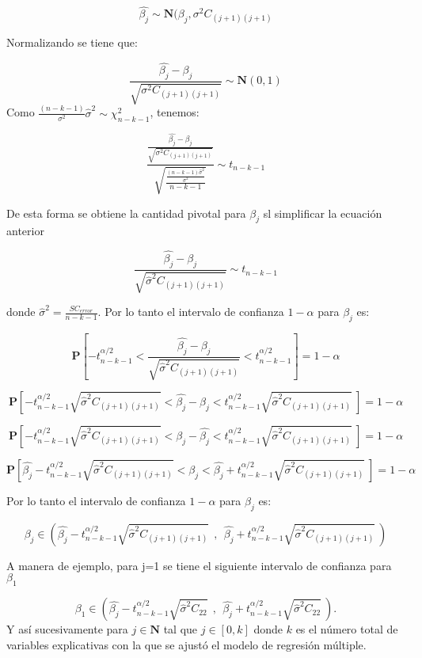 \documentclass[
  a4paper,
  oneside,
  openany]{book}
\begin{document}
\[\hat{\beta_{j}} \sim \mathbf{N}(\beta_{j}, \sigma^2C_{(j+1)(j+1)}\]

Normalizando se tiene que:

\[\frac{\hat{\beta_{j}}-\beta_{j}}{\sqrt{\sigma^2C_{(j+1)(j+1)}}}\sim \mathbf{N}(0,1)\]
Como \(\frac{(n-k-1)}{\sigma^2}\hat{\sigma}^2 \sim \chi^2_{n-k-1}\), tenemos:

\[\frac{\frac{\hat{\beta_{j}}-\beta_{j}}{\sqrt{\sigma^2C_{(j+1)(j+1)}}}}{\sqrt{\frac{\frac{(n-k-1)\hat{\sigma}^2}{\sigma^2}}{n-k-1}}} \sim t_{n-k-1}\]

De esta forma se obtiene la cantidad pivotal para \(\beta_{j}\) sl simplificar la ecuación anterior

\[\frac{\hat{\beta_{j}}-\beta_{j}}{\sqrt{\hat{\sigma}^2C_{(j+1)(j+1)}}}\sim t_{n-k-1}\]

donde \(\hat{\sigma}^2=\frac{SC_{error}}{n-k-1}\). Por lo tanto el intervalo de confianza \(1-\alpha\) para \(\beta_{j}\) es:

\[\mathbf{P} \left[-t^{\alpha/2}_{n-k-1} < \frac{\hat{\beta_{j}}-\beta_{j}}{\sqrt{\hat{\sigma}^2C_{(j+1)(j+1)}}} < t^{\alpha/2}_{n-k-1} \right]= 1- \alpha\]

\[\mathbf{P} \left[-t^{\alpha/2}_{n-k-1}{\sqrt{\hat{\sigma}^2C_{(j+1)(j+1)}}} < \hat{\beta_{j}}-\beta_{j} < t^{\alpha/2}_{n-k-1}{\sqrt{\hat{\sigma}^2C_{(j+1)(j+1)}}} \  \right]= 1- \alpha\]

\[\mathbf{P} \left[-t^{\alpha/2}_{n-k-1}{\sqrt{\hat{\sigma}^2C_{(j+1)(j+1)}}} < \beta_{j}-\hat{\beta_{j}} < t^{\alpha/2}_{n-k-1}{\sqrt{\hat{\sigma}^2C_{(j+1)(j+1)}}}  \ \right]= 1- \alpha\]

\[\mathbf{P} \left[\hat{\beta_{j}}-t^{\alpha/2}_{n-k-1}{\sqrt{\hat{\sigma}^2C_{(j+1)(j+1)}}} < \beta_{j} < \hat{\beta_{j}}+t^{\alpha/2}_{n-k-1}{\sqrt{\hat{\sigma}^2C_{(j+1)(j+1)}}}  \ \right]= 1- \alpha\]

Por lo tanto el intervalo de confianza \(1-\alpha\) para \(\beta_{j}\) es:

\[\beta_{j} \in \left(\hat{\beta_{j}}-t^{\alpha/2}_{n-k-1}{\sqrt{\hat{\sigma}^2C_{(j+1)(j+1)}}} \ \ , \ \ \hat{\beta_{j}}+t^{\alpha/2}_{n-k-1}{\sqrt{\hat{\sigma}^2C_{(j+1)(j+1)}}} \ \right)\]

A manera de ejemplo, para j=1 se tiene el siguiente intervalo de confianza para \(\beta_1\)

\[\beta_{1} \in \left(\hat{\beta_{j}}-t^{\alpha/2}_{n-k-1}{\sqrt{\hat{\sigma}^2C_{22}}} \ \ , \ \ \hat{\beta_{j}}+t^{\alpha/2}_{n-k-1}{\sqrt{\hat{\sigma}^2C_{22}}} \  \right).\]
Y así sucesivamente para \(j \in \mathbf{N}\) tal que \(j \in [0,k]\) donde \(k\) es el número total de variables explicativas con la que se ajustó el modelo de regresión múltiple.
\end{document}
